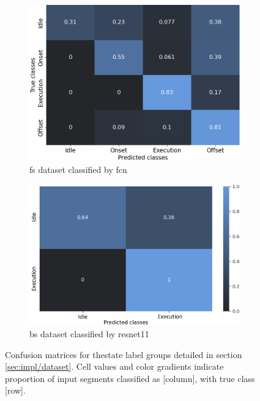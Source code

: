 \begin{figure}[h]
    \begin{subfigure}[b]{0.471\textwidth}
        \centering
        \includegraphics[width=\textwidth]{figures/res_FCN_fstate_cm.png}
        \caption{\acrshort{fs} dataset classified by \acrlong{fcn}}
        \label{fig:res/conf_fstate}
    \end{subfigure}
    \begin{subfigure}[b]{0.529\textwidth}
        \centering
        \includegraphics[width=\textwidth]{figures/res_ResNet11_bstate_cm.png}
        \caption{\acrshort{bs} dataset classified by \acrlong{resnet11}}
        \label{fig:res/conf_bstate}
    \end{subfigure}
    \caption{Confusion matrices for thestate label groups detailed in section \ref{sec:impl/dataset}. Cell values and color gradients indicate proportion of input segments classified as [column], with true class [row].}
    \label{fig:res/conf_state}
\end{figure}
\FloatBarrier

